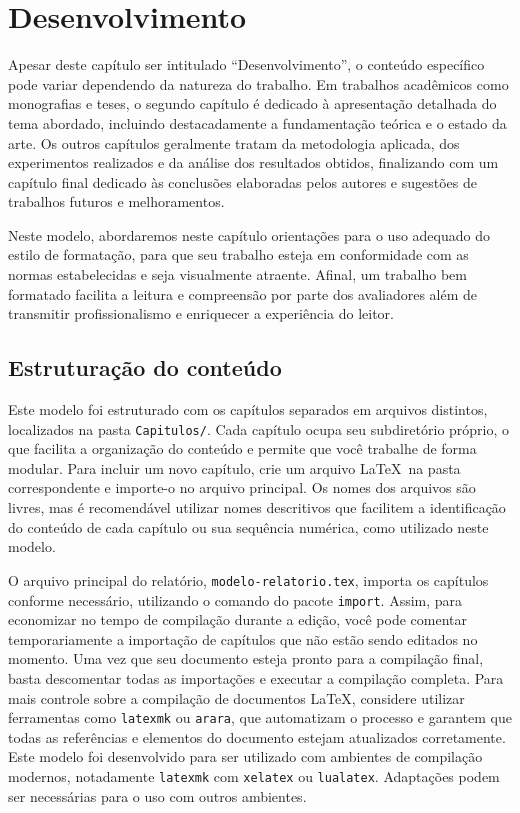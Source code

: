 \chapter{Desenvolvimento}\label{cap:desenvolvimento}

Apesar deste capítulo ser intitulado ``Desenvolvimento'', o conteúdo específico pode variar dependendo
da natureza do trabalho. Em trabalhos acadêmicos como monografias e teses, o segundo capítulo é
dedicado à apresentação detalhada do tema abordado, incluindo destacadamente a fundamentação
teórica e o estado da arte. Os outros capítulos geralmente tratam da metodologia aplicada, dos
experimentos realizados e da análise dos resultados obtidos, finalizando com um capítulo final
dedicado às conclusões elaboradas pelos autores e sugestões de trabalhos futuros e melhoramentos.

Neste modelo, abordaremos neste capítulo orientações para o uso adequado do estilo de formatação,
para que seu trabalho esteja em conformidade com as normas estabelecidas e seja visualmente
atraente. Afinal, um trabalho bem formatado facilita a leitura e compreensão por parte dos
avaliadores além de transmitir profissionalismo e enriquecer a experiência do leitor.

\section{Estruturação do conteúdo}\label{sec:estrutura-desenvolvimento}

Este modelo  foi estruturado com os capítulos separados em arquivos distintos, localizados na
pasta \texttt{Capitulos/}. Cada capítulo ocupa seu subdiretório próprio, o que facilita a
organização do conteúdo e permite que você trabalhe de forma modular. Para
incluir um novo capítulo, crie um arquivo \LaTeX\ na pasta correspondente e importe-o no arquivo
principal. Os nomes dos arquivos são livres, mas é recomendável utilizar nomes descritivos que
facilitem a identificação do conteúdo de cada capítulo ou sua sequência numérica, como utilizado
neste modelo.

O arquivo principal do relatório, \texttt{modelo-relatorio.tex}, importa os capítulos conforme
necessário, utilizando o comando \verb|| do pacote \texttt{import}. Assim, para economizar
no tempo de compilação durante a edição, você pode comentar temporariamente a importação de
capítulos que não estão sendo editados no momento. Uma vez que seu documento esteja pronto para a
compilação final, basta descomentar todas as importações e executar a compilação completa. Para mais
controle sobre a compilação de documentos \LaTeX, considere utilizar ferramentas como
\texttt{latexmk} ou \texttt{arara}, que automatizam o processo e garantem que todas as referências
e elementos do documento estejam atualizados corretamente. Este modelo foi desenvolvido para ser
utilizado com ambientes de compilação modernos, notadamente \texttt{latexmk} com \texttt{xelatex} ou
\texttt{lualatex}. Adaptações podem ser necessárias para o uso com outros ambientes.

